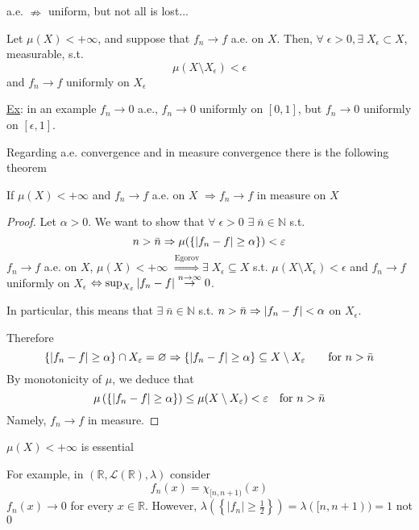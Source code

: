 a.e. \(\nRightarrow\) uniform, but not all is lost...
\begin{theorem}[Egorov]
    Let \(\mu(X) < +\infty\), and suppose that \(f_n \to f\) a.e. on \(X\). Then, \(\forall \; \epsilon > 0, \exists \; X_{\epsilon} \subset X\), measurable, s.t. 
    \[
        \mu(X \setminus X_{\epsilon}) < \epsilon
    \]
    and \(f_n \to f\) uniformly on \(X_{\epsilon}\)
\end{theorem}
\noindent\underline{Ex}: in an example \(f_n \to 0\) a.e., \(f_n \to 0\) uniformly on \([0,1]\), but \(f_n \to 0\) uniformly on \([\epsilon, 1]\).

Regarding a.e. convergence and in measure convergence there is the following theorem
\begin{theorem}
    If \(\mu(X) < +\infty\) and \(f_n \to f\) a.e. on \(X\) \(\Rightarrow f_n \to f\) in measure on \(X\)
\end{theorem}
\begin{proof}
    Let \(\alpha > 0\). We want to show that \(\forall \; \epsilon > 0\) \(\exists \; \bar{n} \in \mathbb{N}\) s.t. 
    \[
        n > \bar{n} \Rightarrow \mu(\left\lbrace \abs{f_n -f} \geq \alpha\right\rbrace) <\varepsilon
    \]
    \(f_n \to f\) a.e. on \(X\), \(\mu(X) < +\infty\) \(\overset{\text{Egorov}}{\Rightarrow} \exists \; X_{\epsilon} \subseteq X\) s.t. \(\mu(X \setminus X_{\epsilon}) < \epsilon\) and \(f_n \to f\) uniformly on \(X_{\epsilon}\) \(\Leftrightarrow \sup_{X_{\varepsilon}} \abs{f_n - f} \overset{n\to \infty}{\to} 0\).

    In particular, this means that \(\exists \; \bar{n} \in \mathbb{N}\) s.t. \(n > \bar{n} \Rightarrow \abs{f_n -f} < \alpha\) on \(X_{\epsilon}\).

    Therefore 
    \[
        \left\{ \abs{f_n -f} \geq \alpha \right\} \cap  X_{\varepsilon} = \varnothing \Rightarrow \left\{ \abs{f_n -f} \geq \alpha \right\} \subseteq X \setminus X_{\varepsilon} \qquad \text{for } n> \bar{n} 
    \]
    By monotonicity of \(\mu\), we deduce that
    \[
        \mu\left(\left\{ \abs{f_n -f} \geq \alpha \right\}\right) \leq \mu(X \setminus X_{\varepsilon}) < \varepsilon \quad \mbox{for }n> \bar{n}
    \]
    Namely, \(f_n \to f\) in measure.
\end{proof}
\begin{remark}
    \(\mu(X) < +\infty\) is essential
\end{remark}
For example, in \((\mathbb{R}, \mathcal{L}(\mathbb{R}), \lambda)\) consider
\[
    f_n (x) = \chi_{[n, n+1)}(x)
\]
\(f_n(x) \to 0\) for every \(x \in \mathbb{R}\). However, \(\lambda(\left\lbrace \vert f_n \vert \geq \frac{1}{2}\right\rbrace) = \lambda([n, n+1)) = 1\) not \(0\)
